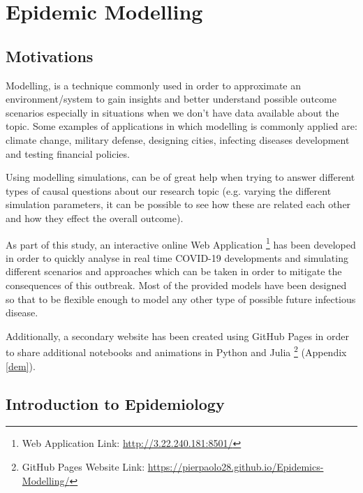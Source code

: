\chapter{Epidemic Modelling}
\label{ch:progress}

\section{Motivations}
Modelling, is a technique commonly used in order to approximate an environment/system to gain insights and better understand possible outcome scenarios especially in situations when we don't have data available about the topic. Some examples of applications in which modelling is commonly applied are: climate change, military defense, designing cities, infecting diseases development and testing financial policies. 

Using modelling simulations, can be of great help when trying to answer different types of causal questions about our research topic (e.g. varying the different simulation parameters, it can be possible to see how these are related each other and how they effect the overall outcome). 

As part of this study, an interactive online Web Application \footnote{Web Application Link: \url{http://3.22.240.181:8501/}} has been developed in order to quickly analyse in real time COVID-19 developments and simulating different scenarios and approaches which can be taken in order to mitigate the consequences of this outbreak. Most of the provided models have been designed so that to be flexible enough to model any other type of possible future infectious disease. 

Additionally, a secondary website has been created using GitHub Pages in order to share additional notebooks and animations in Python and Julia \footnote{GitHub Pages Website Link: \url{https://pierpaolo28.github.io/Epidemics-Modelling/}} (Appendix \ref{dem}). 

\section{Introduction to Epidemiology}

